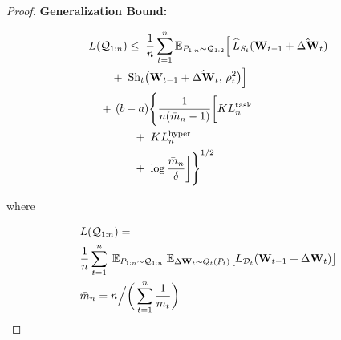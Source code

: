 \documentclass[letterpaper]{article} %
\begin{document}
\begin{proof}
\textbf{Generalization Bound:}

\begin{align}
& L(\mathcal{Q}_{1:n}) \leq\;  \frac{1}{n} \sum_{t=1}^n 
    \mathbb{E}_{P_{1:n} \sim \mathcal{Q}_{1:2}} 
    \Big[\, 
        \widehat{L}_{S_t}(\mathbf{W}_{t-1} + \hat{\Delta\mathbf{W}}_t) \notag \\
&\qquad
    +\; \mathrm{Sh}_t\big(\mathbf{W}_{t-1} + \hat{\Delta\mathbf{W}}_t,\, \rho_t^2\big)
    \Big] \notag \\
&\quad
    +\, (b-a)\Bigg\{ \frac{1}{n(\bar{m}_n - 1)} \bigg[
            KL^{\text{task}}_n \notag \\
&\qquad\qquad
            +\; KL^{\text{hyper}}_n \notag \\
&\qquad\qquad
            +\; \log\frac{\bar{m}_n}{\delta}
        \bigg] \Bigg\}^{1/2}
\end{align}



    
    where


\begin{align}
&L(\mathcal{Q}_{1:n}) = \notag\\
& \frac{1}{n} \sum_{t=1}^n\;
    \mathbb{E}_{P_{1:n} \sim \mathcal{Q}_{1:n}}\;
    \mathbb{E}_{\Delta\mathbf{W}_t \sim Q_t(P_t)}
    \big[
        L_{\mathcal{D}_t}(\mathbf{W}_{t-1} + \Delta\mathbf{W}_t)
    \big] \notag \\
&\bar{m}_n =
    n \Big/ \bigg( \sum_{t=1}^n \frac{1}{m_t} \bigg) \notag
\end{align}




\end{proof}
\end{document}
